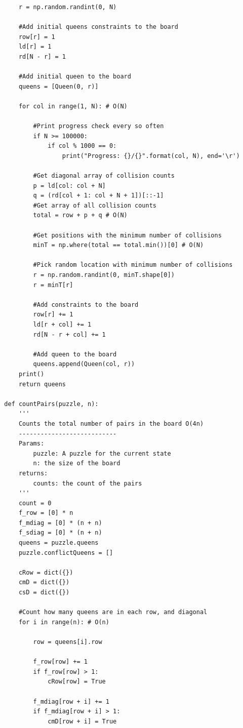 \documentclass{article}
\begin{document}
\newpage
\begin{verbatim}  
      r = np.random.randint(0, N)
   
      #Add initial queens constraints to the board
      row[r] = 1
      ld[r] = 1
      rd[N - r] = 1
  
      #Add initial queen to the board
      queens = [Queen(0, r)]
  
      for col in range(1, N): # O(N)
  
          #Print progress check every so often
          if N >= 100000:
              if col % 1000 == 0:
                  print("Progress: {}/{}".format(col, N), end='\r') 
  
          #Get diagonal array of collision counts
          p = ld[col: col + N]
          q = (rd[col + 1: col + N + 1])[::-1]
          #Get array of all collision counts
          total = row + p + q # O(N)
  
          #Get positions with the minimum number of collisions
          minT = np.where(total == total.min())[0] # O(N)
  
          #Pick random location with minimum number of collisions
          r = np.random.randint(0, minT.shape[0])
          r = minT[r]
  
          #Add constraints to the board
          row[r] += 1
          ld[r + col] += 1
          rd[N - r + col] += 1
  
          #Add queen to the board
          queens.append(Queen(col, r))
      print()
      return queens
  
  def countPairs(puzzle, n):
      '''
      Counts the total number of pairs in the board O(4n)
      ---------------------------
      Params:
          puzzle: A puzzle for the current state
          n: the size of the board
      returns:
          counts: the count of the pairs
      '''
      count = 0
      f_row = [0] * n
      f_mdiag = [0] * (n + n)
      f_sdiag = [0] * (n + n)
      queens = puzzle.queens
      puzzle.conflictQueens = []
  
      cRow = dict({})
      cmD = dict({})
      csD = dict({})
  
      #Count how many queens are in each row, and diagonal
      for i in range(n): # O(n)
  
          row = queens[i].row
  
          f_row[row] += 1
          if f_row[row] > 1:
              cRow[row] = True
  
          f_mdiag[row + i] += 1
          if f_mdiag[row + i] > 1:
              cmD[row + i] = True
  

\end{verbatim}
\end{document}
